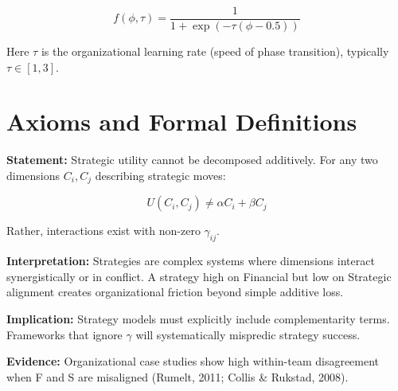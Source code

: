 \begin{equation}
f(\phi, \tau) = \frac{1}{1 + \exp(-\tau(\phi - 0.5))}
\end{equation}

Here $\tau$ is the organizational learning rate (speed of phase transition), typically $\tau \in [1, 3]$.

\section{Axioms and Formal Definitions}
\label{sec:sdm-axioms}

\begin{tcolorbox}[colback=gray!5!white, colframe=gray!75!black,
    title=Axiom SDM-1: Complementarity Necessity]

\textbf{Statement:} Strategic utility cannot be decomposed additively. For any two dimensions $C_i, C_j$ describing strategic moves:

\begin{equation}
U(C_i, C_j) \neq \alpha C_i + \beta C_j
\end{equation}

Rather, interactions exist with non-zero $\gamma_{ij}$.

\textbf{Interpretation:} Strategies are complex systems where dimensions interact synergistically or in conflict. A strategy high on Financial but low on Strategic alignment creates organizational friction beyond simple additive loss.

\textbf{Implication:} Strategy models must explicitly include complementarity terms. Frameworks that ignore $\gamma$ will systematically mispredic strategy success.

\textbf{Evidence:} Organizational case studies show high within-team disagreement when F and S are misaligned (Rumelt, 2011; Collis \& Rukstad, 2008).

\end{tcolorbox}

